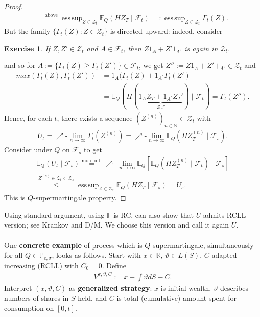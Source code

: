 \documentclass[12pt,a4paper, twoside]{article}
\newtheorem{exe}{Exercise}[section]
\theoremstyle{definition}
\newcommand{\EE}{\mathbb{E}} %
\newcommand{\PP}{\mathbb{P}} %
\DeclareMathOperator*{\esssup}{ess\,sup}
\begin{document}
\begin{proof}
\begin{align*}
&\overset{\text{above}}= \esssup_{Z \in \mathcal{Z}_t} \EE_Q( H Z_T \mid \mathcal{F}_t) =: \esssup_{Z \in \mathcal{Z}_t} \Gamma_t(Z).
\end{align*}
But the family $\{ \Gamma_t (Z): Z \in \mathcal{Z}_t\}$ is directed upward: indeed, consider 
\begin{exe} If $Z, Z' \in \mathcal{Z}_t$ and $A \in \mathcal{F}_t$, then $Z1_A + Z'1_{A^c}$ is again in $\mathcal{Z}_t$. 
\end{exe}
\noindent and so for $A:= \{ \Gamma_t(Z) \geq \Gamma_t(Z')\} \in \mathcal{F}_t$, we get $Z'':= Z1_A + Z' +_{A^c} \in \mathcal{Z}_t$ and \begin{align*}
max( \Gamma_t(Z), \Gamma_t(Z')) &= 1_A( \Gamma_t(Z) + 1_{A^c} \Gamma_t(Z')
\\ & = \EE_Q(H (\underbrace{ 1_A Z_T + 1_{A^c} Z_T'}_{Z_T''}) \mid \mathcal{F}_t) = \Gamma_t(Z'').
\end{align*}
Hence, for each $t$, there exists a sequence $(Z^{(n)})_{n \in \mathbb{N}} \subset \mathcal{Z}_t$ with \begin{align*}
 U_t = \nearrow\text{-}\lim_{n \to \infty} \Gamma_t( Z^{(n)})= \nearrow\text{-}\lim_{n \to \infty} \EE_Q(H Z_T^{(n)} \mid \mathcal{F}_s).
\end{align*}
Consider under $Q$ on $\mathcal{F}_s$ to get  
\begin{align*}
\EE_Q( U_t \mid \mathcal{F}_s) \overset{ \text{mon. int.}}= \nearrow\text{-} \lim_{n \to \infty} \EE_Q[ \EE_Q(HZ_T^{(n)} \mid \mathcal{F}_t ) \mid \mathcal{F}_s] \\
\overset{ Z^{(n)} \in \mathcal{Z}_t \subset \mathcal{Z}_s}\leq  \esssup_{Z \in \mathcal{Z}_s} \EE_Q( H Z_T \mid \mathcal{F}_s) = U_s. 
\end{align*}
This is $Q$-supermartingale property. 
\end{proof}
Using standard argument, using $\mathbb{F}$ is RC, can also show that $U$ admits RCLL version; see Krankov and D/M. We choose this version and call it again $U$. 
\\
\\
One \textbf{concrete example} of process which is $Q$-supermartingale, simultaneously for all $Q \in \PP_{e, \sigma}$, looks as follows. Start with $x \in \mathbb{R}$, $\vartheta \in L(S)$, $C$ adapted increasing (RCLL) with $C_0=0$.  Define  
\begin{align*}
V^{x, \vartheta, C} := x + \int \vartheta dS -C.
\end{align*}
Interpret $(x, \vartheta, C)$ as \textbf{generalized strategy}: $x$ is initial wealth, $\vartheta$ describes numbers of shares in $S$ held, and $C$ is total (cumulative) amount spent for consumption on $[0,t]$. 
\end{document}
